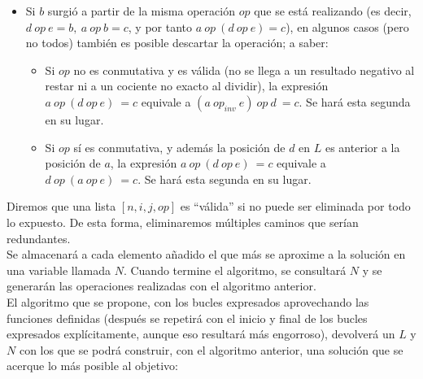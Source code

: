 \documentclass{article}
\begin{document}
\begin{itemize}
	\item Si $b$ surgió a partir de la misma operación $op$ que se está realizando (es decir, $d\ op\ e = b,\ a\ op\ b = c$, y por tanto $a\ op\ (d\ op\ e) = c$), en algunos casos (pero no todos) también es posible descartar la operación; a saber:
	\begin{itemize}
		\item Si $op$ no es conmutativa y es válida (no se llega a un resultado negativo al restar ni a un cociente no exacto al dividir), la expresión $a\ op\ (d\ op\ e)\ = c$ equivale a $(a\ op_{inv}\ e)\ op\ d\ = c$. Se hará esta segunda en su lugar.
		\item Si $op$ sí es conmutativa, y además la posición de $d$ en $L$ es anterior a la posición de $a$, la expresión $a\ op\ (d\ op\ e)\ = c$ equivale a $d\ op\ (a\ op\ e)\ = c$. Se hará esta segunda en su lugar.
	\end{itemize}
\end{itemize}

Diremos que una lista $[n, i, j, op]$ es ``válida'' si no puede ser eliminada por todo lo expuesto. De esta forma, eliminaremos múltiples caminos que serían redundantes.\\

Se almacenará a cada elemento añadido el que más se aproxime a la solución en una variable llamada $N$. Cuando termine el algoritmo, se consultará $N$ y se generarán las operaciones realizadas con el algoritmo anterior. \\

El algoritmo que se propone, con los bucles expresados aprovechando las funciones definidas (después se repetirá con el inicio y final de los bucles expresados explícitamente, aunque eso resultará más engorroso), devolverá un $L$ y $N$ con los que se podrá construir, con el algoritmo anterior, una solución que se acerque lo más posible al objetivo:\\
\end{document}
